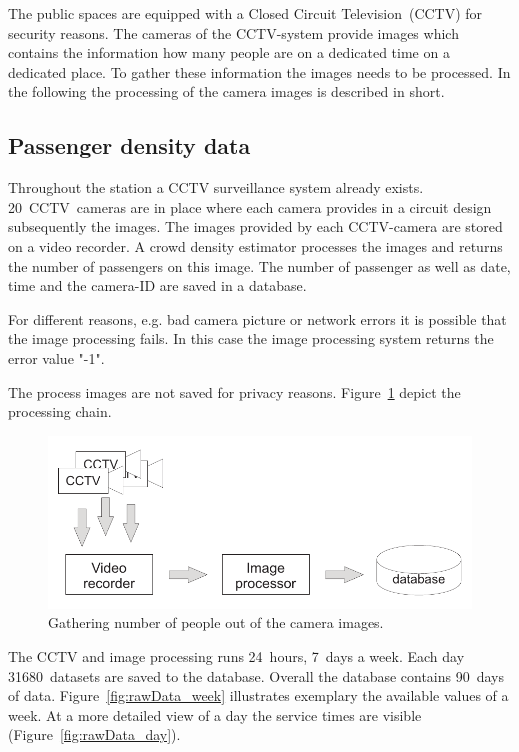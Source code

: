 The public spaces are equipped with a Closed Circuit Television~(CCTV) for security reasons. The cameras of the CCTV-system provide images which contains the information how many people are on a dedicated time on a dedicated place. To gather these information the images needs to be processed. In the following the processing of the camera images is described in short.


\subsection{Passenger density data}
\label{subsec:PassengerDensityData}

Throughout the station a CCTV surveillance system already exists. 20~CCTV~cameras are in place where each camera provides in a circuit design subsequently the images. The images provided by each CCTV-camera are stored on a video recorder. A crowd density estimator processes the images and returns the number of passengers on this image. The number of passenger as well as date, time and the camera-ID are saved in a database.

For different reasons, e.g. bad camera picture or network errors it is possible that the image processing fails. In this case the image processing system returns the error value "-1".

The process images are not saved for privacy reasons. Figure~\ref{fig:CCTVimageProcessing} depict the processing chain.

\begin{figure}[htb]
  \centering
  \includegraphics[width=\linewidth]{Figures/imageProcessing.pdf} 
  \caption{Gathering number of people out of the camera images.}
  \label{fig:CCTVimageProcessing}
\end{figure}

The CCTV and image processing runs 24~hours, 7~days a week. Each day 31680~datasets are saved to the database. Overall the database contains 90~days of data.
Figure~\ref{fig:rawData_week} illustrates exemplary the available values of a week. At a more detailed view of a day the service times are visible (Figure~\ref{fig:rawData_day}).

